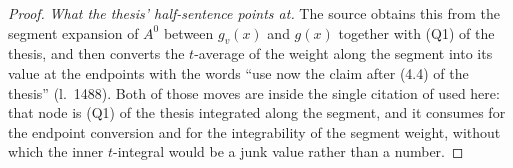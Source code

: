 \begin{proof}
\emph{What the thesis' half-sentence points at.}  The source obtains this from
the segment expansion of $A^0$ between $g_v(x)$ and $g(x)$ together with
(Q1) of the thesis, and then converts the $t$-average of the weight along the segment
into its value at the endpoints with the words ``use now the claim after
(4.4) of the thesis'' (l.~1488).  Both of those moves are inside the single citation
of  used here: that node is (Q1) of the thesis
integrated along the segment, and it consumes
 for the endpoint conversion and
 for the integrability of the segment weight,
without which the inner $t$-integral would be a junk value rather than a number.
\end{proof}
